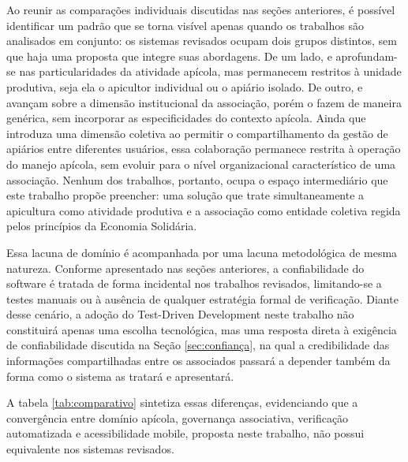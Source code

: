 Ao reunir as comparações individuais discutidas nas seções anteriores, é possível identificar um padrão que se torna visível apenas quando os trabalhos são analisados em conjunto: os sistemas revisados ocupam dois grupos distintos, sem que haja uma proposta que integre suas abordagens. De um lado,  e  aprofundam-se nas particularidades da atividade apícola, mas permanecem restritos à unidade produtiva, seja ela o apicultor individual ou o apiário isolado. De outro,  e  avançam sobre a dimensão institucional da associação, porém o fazem de maneira genérica, sem incorporar as especificidades do contexto apícola. Ainda que  introduza uma dimensão coletiva ao permitir o compartilhamento da gestão de apiários entre diferentes usuários, essa colaboração permanece restrita à operação do manejo apícola, sem evoluir para o nível organizacional característico de uma associação. Nenhum dos trabalhos, portanto, ocupa o espaço intermediário que este trabalho propõe preencher: uma solução que trate simultaneamente a apicultura como atividade produtiva e a associação como entidade coletiva regida pelos princípios da Economia Solidária.

Essa lacuna de domínio é acompanhada por uma lacuna metodológica de mesma natureza. Conforme apresentado nas seções anteriores, a confiabilidade do software é tratada de forma incidental nos trabalhos revisados, limitando-se a testes manuais ou à ausência de qualquer estratégia formal de verificação. Diante desse cenário, a adoção do Test-Driven Development neste trabalho não constituirá apenas uma escolha tecnológica, mas uma resposta direta à exigência de confiabilidade discutida na Seção \ref{sec:confiança}, na qual a credibilidade das informações compartilhadas entre os associados passará a depender também da forma como o sistema as tratará e apresentará.

A tabela \ref{tab:comparativo} sintetiza essas diferenças, evidenciando que a convergência entre domínio apícola, governança associativa, verificação automatizada e acessibilidade mobile, proposta neste trabalho, não possui equivalente nos sistemas revisados.

